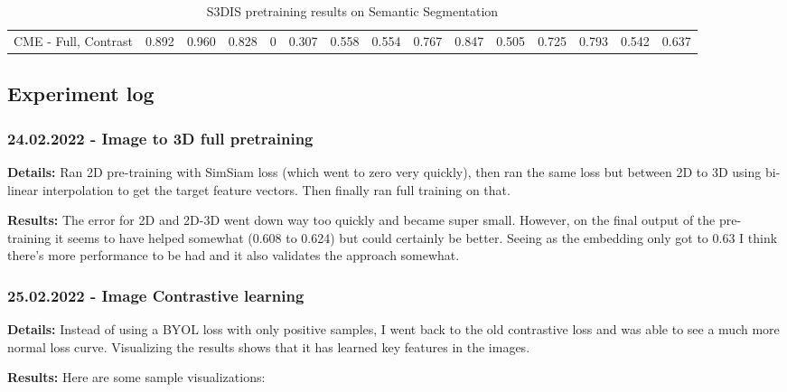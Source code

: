 \documentclass[12pt]{article}
\begin{document}
\begin{center}
\begin{table}[h!]
{\begin{tabular}{ c | c c c c c c c c c c c c c | c }
                CME - Full, Contrast                            & 0.892          & 0.960          & 0.828          & 0              & 0.307          & 0.558          & 0.554          & 0.767          & 0.847          & 0.505          & 0.725          & 0.793          & 0.542          & 0.637          \\
            \end{tabular}
        }
        \caption{S3DIS pretraining results on Semantic Segmentation}
    \end{table}
\end{center}

\subsection{Experiment log}

\subsubsection{24.02.2022 - Image to 3D full pretraining}

\textbf{Details:} Ran 2D pre-training with SimSiam loss (which went to zero very quickly), then ran the same loss but between 2D to 3D using bi-linear interpolation to get the target feature vectors. Then finally ran full training on that.

\textbf{Results:} The error for 2D and 2D-3D went down way too quickly and became super small. However, on the final output of the pre-training it seems to have helped somewhat (0.608 to 0.624) but could certainly be better. Seeing as the embedding only got to 0.63 I think there's more performance to be had and it also validates the approach somewhat.

\subsubsection{25.02.2022 - Image Contrastive learning}

\textbf{Details:} Instead of using a BYOL loss with only positive samples, I went back to the old contrastive loss and was able to see a much more normal loss curve. Visualizing the results shows that it has learned key features in the images.

\textbf{Results:} Here are some sample visualizations:
\end{document}
